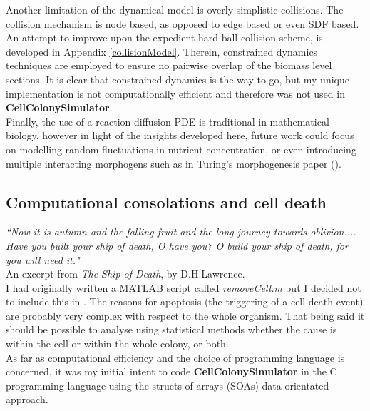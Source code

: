 Another limitation of the dynamical model is overly simplistic collisions.
The collision mechanism is node based, as 
opposed to edge based or even SDF based.
An attempt to improve upon the expedient hard ball collision scheme, 
is developed in Appendix \ref{collisionModel}. Therein,
constrained dynamics techniques are employed to ensure no pairwise
overlap of the biomass level sections. It is clear that constrained
dynamics is the way to go, but my unique implementation is 
not computationally efficient and therefore was not
used in \textbf{CellColonySimulator}.
\\

Finally, the use of a reaction-diffusion PDE is traditional in mathematical biology, however
in light of the insights developed here, future work could focus on modelling 
random fluctuations in nutrient concentration, or even introducing multiple interacting 
morphogens such as in Turing's morphogenesis paper (\cite{turing1990chemical}).



\subsection{Computational consolations and cell death}

\textit{``Now it is autumn and the falling fruit
and the long journey towards oblivion....
Have you built your ship of death, O have you?
O build your ship of death, for you will need it."}
\\
An excerpt from \textit{The Ship of Death}, by D.H.Lawrence.
\\

I had originally written a MATLAB script called
\textit{removeCell.m} but I decided not to include this 
in . The reasons 
for apoptosis (the triggering of a cell death event)
are probably very complex with respect to the whole organism.
That being said it should be possible 
to analyse using statistical methods whether 
the cause is within the cell or within the whole 
colony, or both.
\\

As far as computational efficiency and the choice of programming language is concerned, 
it was my initial intent to code \textbf{CellColonySimulator} in the C programming language 
using the structs of arrays (SOAs) data orientated approach. 
\\

